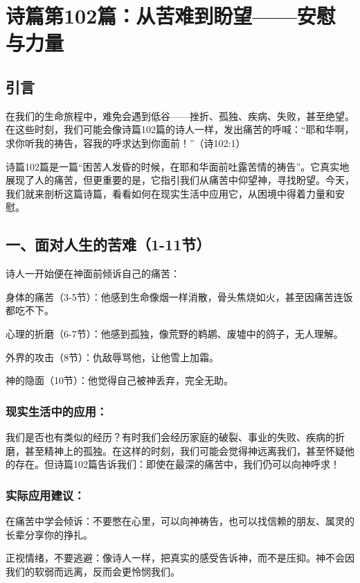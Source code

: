 \documentclass[a4paper, 12pt]{article}
\begin{document}
\section{诗篇第102篇：从苦难到盼望——安慰与力量}

\subsection*{引言}
\hspace{0.6cm}在我们的生命旅程中，难免会遇到低谷——挫折、孤独、疾病、失败，甚至绝望。在这些时刻，我们可能会像诗篇102篇的诗人一样，发出痛苦的呼喊：“耶和华啊，求你听我的祷告，容我的呼求达到你面前！”（诗102:1）

诗篇102篇是一篇“困苦人发昏的时候，在耶和华面前吐露苦情的祷告”。它真实地展现了人的痛苦，但更重要的是，它指引我们从痛苦中仰望神，寻找盼望。今天，我们就来剖析这篇诗篇，看看如何在现实生活中应用它，从困境中得着力量和安慰。

\subsection*{一、面对人生的苦难（1-11节）}
诗人一开始便在神面前倾诉自己的痛苦：

身体的痛苦（3-5节）：他感到生命像烟一样消散，骨头焦烧如火，甚至因痛苦连饭都吃不下。

心理的折磨（6-7节）：他感到孤独，像荒野的鹈鹕、废墟中的鸽子，无人理解。

外界的攻击（8节）：仇敌辱骂他，让他雪上加霜。

神的隐面（10节）：他觉得自己被神丢弃，完全无助。

\subsubsection*{现实生活中的应用：}
我们是否也有类似的经历？有时我们会经历家庭的破裂、事业的失败、疾病的折磨，甚至精神上的孤独。在这样的时刻，我们可能会觉得神远离我们，甚至怀疑他的存在。但诗篇102篇告诉我们：即使在最深的痛苦中，我们仍可以向神呼求！

\subsubsection*{实际应用建议：}

\hspace{0.6cm}在痛苦中学会倾诉：不要憋在心里，可以向神祷告，也可以找信赖的朋友、属灵的长辈分享你的挣扎。

正视情绪，不要逃避：像诗人一样，把真实的感受告诉神，而不是压抑。神不会因我们的软弱而远离，反而会更怜悯我们。
\end{document}
